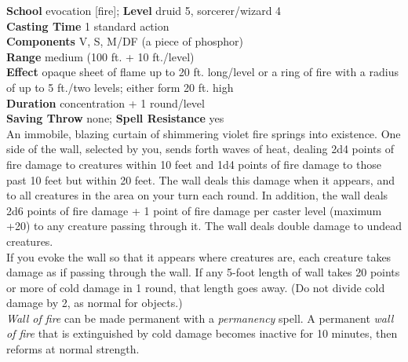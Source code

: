 \textbf{School} evocation [fire]; \textbf{Level} druid 5, sorcerer/wizard 4\\
\textbf{Casting Time} 1 standard action\\
\textbf{Components} V, S, M/DF (a piece of phosphor)\\
\textbf{Range }medium (100 ft. + 10 ft./level)\\
\textbf{Effect} opaque sheet of flame up to 20 ft. long/level or a ring of fire with a radius of up to 5 ft./two levels; either form 20 ft. high\\
\textbf{Duration} concentration + 1 round/level\\
\textbf{Saving Throw} none; \textbf{Spell Resistance} yes\\
An immobile, blazing curtain of shimmering violet fire springs into existence. One side of the wall, selected by you, sends forth waves of heat, dealing 2d4 points of fire damage to creatures within 10 feet and 1d4 points of fire damage to those past 10 feet but within 20 feet. The wall deals this damage when it appears, and to all creatures in the area on your turn each round. In addition, the wall deals 2d6 points of fire damage + 1 point of fire damage per caster level (maximum +20) to any creature passing through it. The wall deals double damage to undead creatures.\\
If you evoke the wall so that it appears where creatures are, each creature takes damage as if passing through the wall. If any 5-foot length of wall takes 20 points or more of cold damage in 1 round, that length goes away. (Do not divide cold damage by 2, as normal for objects.)\\
\textit{Wall of fire }can be made permanent with a \textit{permanency }spell. A permanent \textit{wall of fire }that is extinguished by cold damage becomes inactive for 10 minutes, then reforms at normal strength.\\
